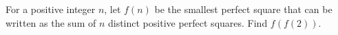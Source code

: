 For a positive integer $n$, let $f(n)$ be the smallest perfect square that can be written as the sum of $n$ distinct positive perfect squares. Find $f(f(2))$.
